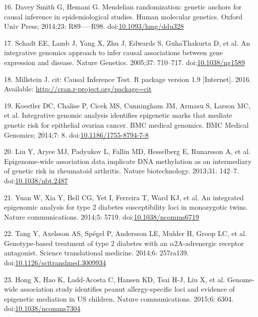 \documentclass[]{article}
\begin{document}
\leavevmode\hypertarget{ref-DaveySmithHemani2014}{}%
16. Davey Smith G, Hemani G. Mendelian randomization: genetic anchors
for causal inference in epidemiological studies. Human molecular
genetics. Oxford Univ Press; 2014;23: R89-----R98.
doi:\href{https://doi.org/10.1093/hmg/ddu328}{10.1093/hmg/ddu328}

\leavevmode\hypertarget{ref-Schadt2005}{}%
17. Schadt EE, Lamb J, Yang X, Zhu J, Edwards S, GuhaThakurta D, et al.
An integrative genomics approach to infer causal associations between
gene expression and disease. Nature Genetics. 2005;37: 710--717.
doi:\href{https://doi.org/10.1038/ng1589}{10.1038/ng1589}

\leavevmode\hypertarget{ref-Millstein2016}{}%
18. Millstein J. cit: Causal Inference Test. R package version 1.9
{[}Internet{]}. 2016. Available:
\url{http://cran.r-project.org/package=cit}

\leavevmode\hypertarget{ref-Koestler2014}{}%
19. Koestler DC, Chalise P, Cicek MS, Cunningham JM, Armasu S, Larson
MC, et al. Integrative genomic analysis identifies epigenetic marks that
mediate genetic risk for epithelial ovarian cancer. BMC medical
genomics. BMC Medical Genomics; 2014;7: 8.
doi:\href{https://doi.org/10.1186/1755-8794-7-8}{10.1186/1755-8794-7-8}

\leavevmode\hypertarget{ref-Liu2013}{}%
20. Liu Y, Aryee MJ, Padyukov L, Fallin MD, Hesselberg E, Runarsson A,
et al. Epigenome-wide association data implicate DNA methylation as an
intermediary of genetic risk in rheumatoid arthritis. Nature
biotechnology. 2013;31: 142--7.
doi:\href{https://doi.org/10.1038/nbt.2487}{10.1038/nbt.2487}

\leavevmode\hypertarget{ref-Yuan2014}{}%
21. Yuan W, Xia Y, Bell CG, Yet I, Ferreira T, Ward KJ, et al. An
integrated epigenomic analysis for type 2 diabetes susceptibility loci
in monozygotic twins. Nature communications. 2014;5: 5719.
doi:\href{https://doi.org/10.1038/ncomms6719}{10.1038/ncomms6719}

\leavevmode\hypertarget{ref-Tang2014}{}%
22. Tang Y, Axelsson AS, Spégel P, Andersson LE, Mulder H, Groop LC, et
al. Genotype-based treatment of type 2 diabetes with an
\(\alpha\)2A-adrenergic receptor antagonist. Science translational
medicine. 2014;6: 257ra139.
doi:\href{https://doi.org/10.1126/scitranslmed.3009934}{10.1126/scitranslmed.3009934}

\leavevmode\hypertarget{ref-Hong2015}{}%
23. Hong X, Hao K, Ladd-Acosta C, Hansen KD, Tsai H-J, Liu X, et al.
Genome-wide association study identifies peanut allergy-specific loci
and evidence of epigenetic mediation in US children. Nature
communications. 2015;6: 6304.
doi:\href{https://doi.org/10.1038/ncomms7304}{10.1038/ncomms7304}
\end{document}
